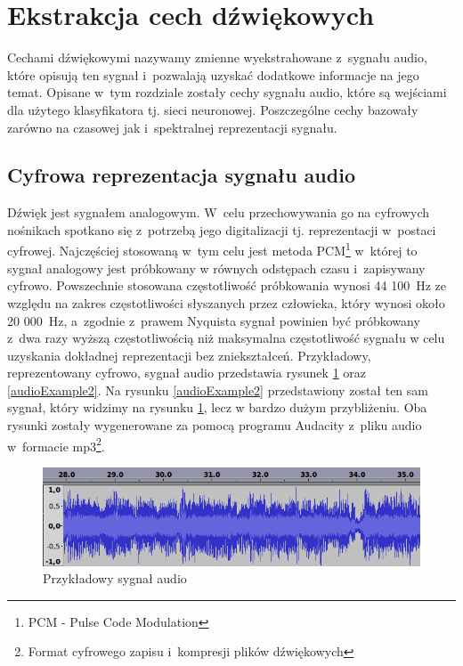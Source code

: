 \section{Ekstrakcja cech dźwiękowych}\label{rozdzial_ekstrakcja}
Cechami dźwiękowymi nazywamy zmienne wyekstrahowane z~sygnału audio, które opisują ten sygnał i~pozwalają uzyskać dodatkowe informacje na jego temat\cite{phdWork}. Opisane w~tym rozdziale zostały cechy sygnału audio, które są wejściami dla użytego klasyfikatora tj. sieci neuronowej. Poszczególne cechy bazowały zarówno na czasowej jak i~spektralnej reprezentacji sygnału.

\subsection{Cyfrowa reprezentacja sygnału audio}
Dźwięk jest sygnałem analogowym. W~celu przechowywania go na cyfrowych nośnikach spotkano się z~potrzebą jego digitalizacji tj. reprezentacji w~postaci cyfrowej. Najczęściej stosowaną w~tym celu jest metoda PCM\footnote{PCM - Pulse Code Modulation}
w~której to sygnał analogowy jest próbkowany w równych odstępach czasu i~zapisywany cyfrowo. Powszechnie stosowana częstotliwość próbkowania wynosi 44 100~Hz ze względu na zakres częstotliwości słyszanych przez człowieka, który wynosi około 20 000~Hz, a~zgodnie z~prawem Nyquista sygnał powinien być próbkowany z~dwa razy wyższą częstotliwością niż maksymalna częstotliwość sygnału w celu uzyskania dokładnej reprezentacji bez zniekształceń\cite{signalProcessing}. Przykładowy, reprezentowany cyfrowo, sygnał audio przedstawia rysunek \ref{audioExample1} oraz \ref{audioExample2}. Na rysunku \ref{audioExample2} przedstawiony został ten sam sygnał, który widzimy na rysunku \ref{audioExample1}, lecz w bardzo dużym przybliżeniu. Oba rysunki zostały wygenerowane za pomocą programu Audacity\cite{audacity} z~pliku audio w~formacie mp3\footnote{Format cyfrowego zapisu i~kompresji plików dźwiękowych}.

\begin{figure}[ht!]
\centering
\includegraphics[scale=0.5]{res/exampleAudio1.png}
\caption{Przykładowy sygnał audio\label{audioExample1}}
\end{figure}

